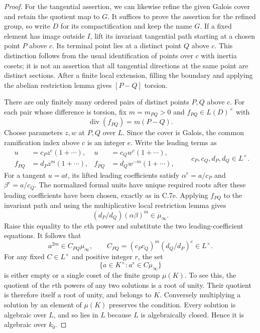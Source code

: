 \begin{proof}
For the tangential assertion, we can likewise refine the given
Galois cover and retain the quotient map to $G$. It suffices to
prove the assertion for the refined group, so write $D$ for its
compactification and keep the name $G$. If a fixed element has
image outside $I$, lift its invariant tangential path starting at
a chosen point $P$ above $c$. Its terminal point lies at a distinct
point $Q$ above $c$. This distinction follows from the usual
identification of points over $c$ with inertia cosets; it is not
an assertion that all tangential directions at the same point are
distinct sections. After a finite local extension, filling the
boundary and applying the abelian restriction lemma gives
$[P-Q]$ torsion.

There are only finitely many ordered pairs of distinct points
$P,Q$ above $c$. For each pair whose difference is torsion, fix
$m=m_{PQ}>0$ and $f_{PQ}\in L(D)^\times$ with
\[
                         \operatorname{div}(f_{PQ})=m(P-Q).
\]
Choose parameters $z,w$ at $P,Q$ over $L$. Since the cover is
Galois, the common ramification index above $c$ is an integer $e$.
Write the leading terms as
\[
 \begin{aligned}
 u&=c_Pz^e(1+\cdots),&
 u&=c_Qw^e(1+\cdots),\\
 f_{PQ}&=d_Pz^m(1+\cdots),&
 f_{PQ}&=d_Qw^{-m}(1+\cdots),
 \end{aligned}
 \qquad c_P,c_Q,d_P,d_Q\in L^\times.
                                                               \tag{C.7f.2}
\]
For a tangent $u=a t$, its lifted leading coefficients satisfy
$\alpha^e=a/c_P$ and $\beta^e=a/c_Q$. The normalized formal
units have unique required roots after these leading coefficients
have been chosen, exactly as in C.7e. Applying $f_{PQ}$ to the
invariant path and using the multiplicative local restriction
lemma gives
\[
                  (d_P/d_Q)(\alpha\beta)^m\in\mu_\infty.
\]
Raise this equality to the $e$th power and substitute the two
leading-coefficient equations. It follows that
\[
 a^{2m}\in C_{PQ}\mu_\infty,
 \qquad
 C_{PQ}=(c_Pc_Q)^m(d_Q/d_P)^e\in L^\times.                    \tag{C.7f.3}
\]
For any fixed $C\in L^\times$ and positive integer $r$, the set
\[
                    \{a\in K^\times:a^r\in C\mu_\infty\}
                                                               \tag{C.7f.4}
\]
is either empty or a single coset of the finite group $\mu(K)$.
To see this, the quotient of the $r$th powers of any two solutions
is a root of unity. Their quotient is therefore itself a root of
unity, and belongs to $K$. Conversely multiplying a solution by
an element of $\mu(K)$ preserves the condition. Every solution is
algebraic over $L$, and so lies in $L$ because $L$ is algebraically
closed. Hence it is algebraic over $k_0$.


\end{proof}

